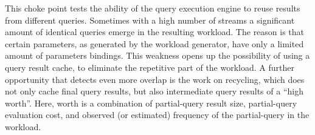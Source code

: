 
This choke point tests the ability of the query execution engine to reuse
results from different queries. Sometimes with a high number of streams a
significant amount of identical queries emerge in the resulting workload. The
reason is that certain parameters, as generated by the workload generator, have
only a limited amount of parameters bindings. This weakness opens up the
possibility of using a query result cache, to eliminate the repetitive part of
the workload. A further opportunity that detects even more overlap is the work
on recycling, which does not only cache final query results, but also
intermediate query results of a ``high worth''. Here, worth is a combination of
partial-query result size, partial-query evaluation cost, and observed (or
estimated) frequency of the partial-query in the workload.


